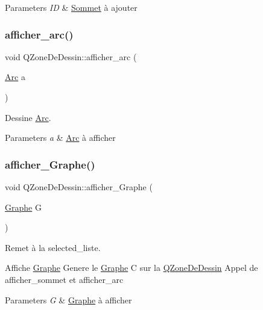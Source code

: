 \begin{DoxyParams}{Parameters}
{\em ID} & \hyperlink{classSommet}{Sommet} \`{a} ajouter \\
\hline
\end{DoxyParams}
\mbox{\label{classQZoneDeDessin_aa500ad8e2c45c43d8d729b3cf64271e2}} 
\subsubsection{\texorpdfstring{afficher\+\_\+arc()}{afficher\_arc()}}
{\footnotesize\ttfamily void Q\+Zone\+De\+Dessin\+::afficher\+\_\+arc (\begin{DoxyParamCaption}\item[{\hyperlink{classArc}{Arc}}]{a }\end{DoxyParamCaption})}



Dessine \hyperlink{classArc}{Arc}. 


\begin{DoxyParams}{Parameters}
{\em a} & \hyperlink{classArc}{Arc} \`{a} afficher \\
\hline
\end{DoxyParams}
\mbox{\label{classQZoneDeDessin_a71e84d55e8787ab3bc6f214714eb6cbd}} 
\subsubsection{\texorpdfstring{afficher\+\_\+\+Graphe()}{afficher\_Graphe()}}
{\footnotesize\ttfamily void Q\+Zone\+De\+Dessin\+::afficher\+\_\+\+Graphe (\begin{DoxyParamCaption}\item[{\hyperlink{classGraphe}{Graphe}}]{G }\end{DoxyParamCaption})}



Remet \`{a} la selected\+\_\+liste. 

Affiche \hyperlink{classGraphe}{Graphe} Genere le \hyperlink{classGraphe}{Graphe} C sur la \hyperlink{classQZoneDeDessin}{Q\+Zone\+De\+Dessin} Appel de afficher\+\_\+sommet et afficher\+\_\+arc 
\begin{DoxyParams}{Parameters}
{\em G} & \hyperlink{classGraphe}{Graphe} \`{a} afficher \\
\hline
\end{DoxyParams}
\mbox{\label{classQZoneDeDessin_a12f10a0404159fbd4447a136461f1086}} 
